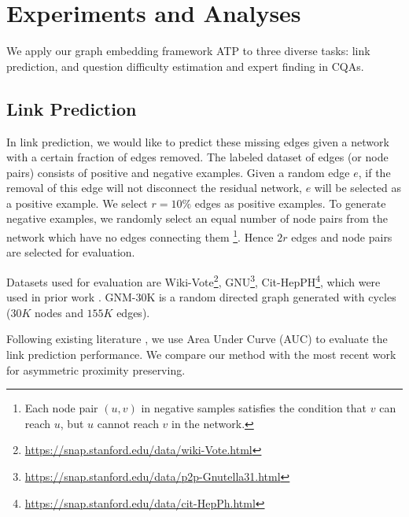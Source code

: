 \documentclass[letterpaper]{article} \usepackage{aaai19}  \usepackage{times}  \usepackage{helvet}  \usepackage{courier}  \usepackage{url}  \usepackage{graphicx}  \usepackage{booktabs} \usepackage{xcolor}
\begin{document}
\section{Experiments and Analyses}
\label{sec:experiments}

We apply our graph embedding framework ATP to three diverse tasks: link prediction, and  question difficulty estimation and expert finding in CQAs.

\subsection{Link Prediction}
\label{sec:link_prediction}

In link prediction, we would like to predict these missing edges given a network with a certain fraction of edges removed. 
The labeled dataset of edges (or node pairs) consists of positive and negative examples. Given a random edge $e$, if the removal of this edge will not disconnect the residual network, $e$ will be selected as a positive example. We select $r = 10\%$ edges as positive examples. To generate negative examples, we randomly select an equal number of node pairs from the network which have no edges connecting them \footnote{Each node pair $(u,v)$ in negative samples satisfies the condition that $v$ can reach $u$, but $u$ cannot reach $v$ in the network.}. Hence $2r$ edges and node pairs are selected for evaluation.



Datasets used for evaluation are Wiki-Vote\footnote{\url{https://snap.stanford.edu/data/wiki-Vote.html}}, GNU\footnote{\url{https://snap.stanford.edu/data/p2p-Gnutella31.html}},  Cit-HepPH\footnote{\url{https://snap.stanford.edu/data/cit-HepPh.html}}, which were used in prior work \cite{Lai2017Prune}. GNM-30K is a random directed graph generated with cycles ($30K$ nodes and $155K$ edges).



Following existing literature \cite{grovernode2vec,ijcai2017-fastNetworkEmbedding,Tran2018}, we use Area Under Curve (AUC) to evaluate the link prediction performance. We compare our method with the most recent work for asymmetric proximity preserving.
\end{document}
